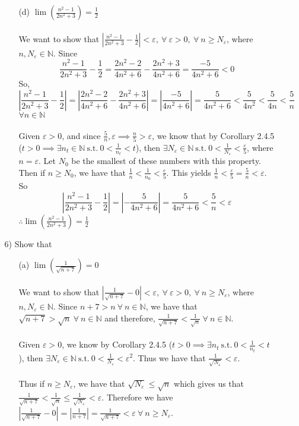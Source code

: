 \documentclass[12pt,letterpaper]{article}
\newcommand{\st}{\ \text{s.t.}\ }
\newcommand{\abs}[1]{\left\lvert #1 \right\rvert}
\newcommand{\N}{\mathbb{N}}
\theoremstyle{case}
\begin{document}
\begin{enumerate}
\begin{enumerate}
\begin{enumerate}
					\item[(d)] $\lim (\frac{n^2-1}{2n^2 + 3})= \frac{1}{2}$
					\\\\We want to show that $\abs{\frac{n^2-1}{2n^2+3}-\frac{1}{2}} < \varepsilon,\ \forall\ \varepsilon>0,\ \forall\ n \geq N_\varepsilon$, where $n,N_\varepsilon \in \N$. Since
					\[\frac{n^2-1}{2n^2+3}-\frac{1}{2}=\frac{2n^2-2}{4n^2+6}-\frac{2n^2+3}{4n^2+6}=\frac{-5}{4n^2+6}<0\]
					So,
					\[\abs{\frac{n^2-1}{2n^2+3}-\frac{1}{2}}=\abs{\frac{2n^2-2}{4n^2+6}-\frac{2n^2+3}{4n^2+6}}=\abs{\frac{-5}{4n^2+6}}=\frac{5}{4n^2+6}<\frac{5}{4n^2}<\frac{5}{4n}<\frac{5}{n}\]
					$\forall n \in \N$
					\\\\Given $\varepsilon >0$, and since $\frac{5}{n},\varepsilon \implies \frac{n}{5} > \varepsilon$, we know that by Corollary 2.4.5 ($t>0 \implies \exists n_t \in \N \st 0<\frac{1}{n_t}<t$), then $\exists N_\varepsilon \in \N \st 0<\frac{1}{N_\varepsilon}<\frac{\varepsilon}{5}$, where $n=\varepsilon$. Let $N_0$ be the smallest of these numbers with this property. Then if $n \geq N_0$, we have that $\frac{1}{n}<\frac{1}{n_0}<\frac{\varepsilon}{5}$. This yields $\frac{1}{n}<\frac{\varepsilon}{5}=\frac{5}{n}<\varepsilon$. So
					\[\abs{\frac{n^2-1}{2n^2+3}-\frac{1}{2}}=\abs{-\frac{5}{4n^2+6}}=\frac{5}{4n^2+6}<\frac{5}{n}<\varepsilon\]
					$\therefore \lim (\frac{n^2-1}{2n^2+3})=\frac{1}{2}$
				\end{enumerate}
			\item[6)] Show that
				\begin{enumerate}
					\item[(a)] $\lim (\frac{1}{\sqrt{n+7}})=0$
					\\\\We want to show that $\abs{\frac{1}{\sqrt{n+7}}-0}<\varepsilon,\ \forall\ \varepsilon>0,\ \forall\ n \geq N_\varepsilon$, where $n,N_\varepsilon \in \N$.
					Since $n+7 > n\ \forall\ n \in \N$, we have that $\sqrt{n+7}>\sqrt{n}\ \forall\ n \in \N$ and therefore, $\frac{1}{\sqrt{n+7}}<\frac{1}{\sqrt{n}}\ \forall\ n \in \N$.
					\\\\Given $\varepsilon>0$, we know by Corollary 2.4.5 ($t>0 \implies \exists n_t \st 0 < \frac{1}{n_t}<t$), then $\exists N_\varepsilon \in \N \st 0 < \frac{1}{N_\varepsilon}<\varepsilon^2$. Thus we have that $\frac{1}{\sqrt{N_\varepsilon}}<\varepsilon$.
					\\\\Thus if $n \geq N_\varepsilon$, we have that $\sqrt{N_\varepsilon}\leq \sqrt{n}$ which gives us that $\frac{1}{\sqrt{n+7}}<\frac{1}{\sqrt{n}}\leq\frac{1}{\sqrt{N_\varepsilon}}<\varepsilon$. Therefore we have $\abs{\frac{1}{\sqrt{n+7}}-0}=\abs{\frac{1}{n+7}}=\frac{1}{\sqrt{n+7}}<\varepsilon\ \forall\ n \geq N_\varepsilon$.

\end{enumerate}
\end{enumerate}
\end{enumerate}
\end{document}
